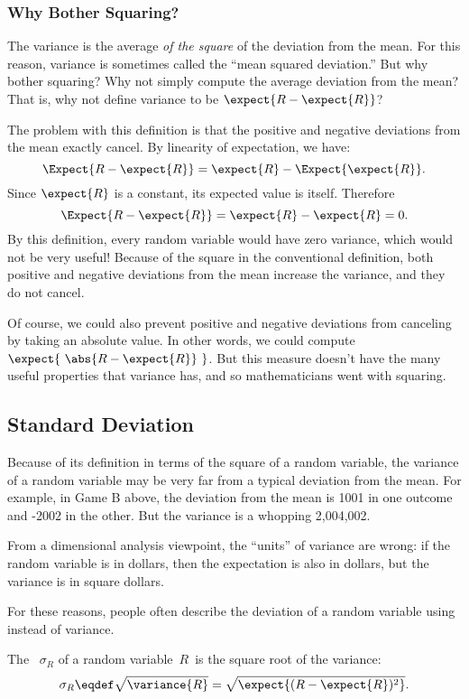 \subsubsection{Why Bother Squaring?}

The variance is the average \emph{of the square} of the deviation from the
mean.  For this reason, variance is sometimes called the ``mean squared
deviation.''  But why bother squaring?  Why not simply compute the average
deviation from the mean?  That is, why not define variance to be
$\expect{R - \expect{R}}$?

The problem with this definition is that the positive and negative
deviations from the mean exactly cancel.  By linearity of expectation,
we have:
\[
  \Expect{R - \expect{R}} = \expect{R} - \Expect{\expect{R}}.
\]
Since $\expect{R}$ is a constant, its expected value is itself. Therefore
\[
    \Expect{R - \expect{R}} = \expect{R} - \expect{R} = 0.
\]
By this definition, every random variable would have zero variance,
which would not be very useful!  Because of the square in the
conventional definition, both positive and negative deviations from
the mean increase the variance, and they do not cancel.

Of course, we could also prevent positive and negative deviations from
canceling by taking an absolute value.  In other words, we could
compute $\expect{\ \abs{R - \expect{R}}\ }$.  But this measure doesn't
have the many useful properties that variance has, and so
mathematicians went with squaring.

\subsection{Standard Deviation}

Because of its definition in terms of the square of a random variable,
the variance of a random variable may be very far from a typical
deviation from the mean.  For example, in Game B above, the deviation
from the mean is 1001 in one outcome and -2002 in the other. But the
variance is a whopping 2,004,002.

From a dimensional analysis viewpoint, the ``units'' of variance are
wrong: if the random variable is in dollars, then the expectation is
also in dollars, but the variance is in square dollars.  

For these reasons, people often describe the deviation of a random
variable using  instead of variance.

\begin{definition}
The ~$\sigma_R$ of a random variable~$R$~is
the square root of the variance:
\[
    \sigma_R \eqdef \sqrt{\variance{R}} = \sqrt{\expect{(R - \expect{R})^2}}.
\]
\end{definition}

